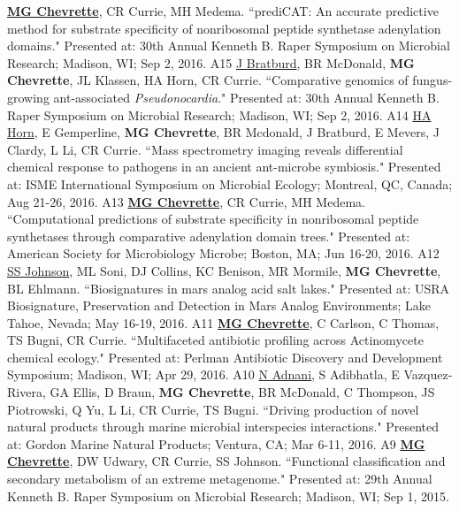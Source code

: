 \begin{cvpubs}
  \cvpub
    {\textbf{\underline{MG Chevrette}}, CR Currie, MH Medema.  ``prediCAT: An accurate predictive method for substrate specificity of nonribosomal peptide synthetase adenylation domains." Presented at: 30th Annual Kenneth B. Raper Symposium on Microbial Research; Madison, WI; Sep 2, 2016.} %
    {A15} %
  \cvpub
    {\underline{J Bratburd}, BR McDonald, \textbf{MG Chevrette}, JL Klassen, HA Horn, CR Currie. ``Comparative genomics of fungus-growing ant-associated \textit{Pseudonocardia}." Presented at: 30th Annual Kenneth B. Raper Symposium on Microbial Research; Madison, WI; Sep 2, 2016.} %
    {A14} %
  \cvpub
    {\underline{HA Horn}, E Gemperline, \textbf{MG Chevrette}, BR Mcdonald, J Bratburd, E Mevers, J Clardy, L Li, CR Currie. ``Mass spectrometry imaging reveals differential chemical response to pathogens in an ancient ant-microbe symbiosis." Presented at: ISME International Symposium on Microbial Ecology; Montreal, QC, Canada; Aug 21-26, 2016.} %
    {A13} %
  \cvpub
    {\textbf{\underline{MG Chevrette}}, CR Currie, MH Medema.  ``Computational predictions of substrate specificity in nonribosomal peptide synthetases through comparative adenylation domain trees." Presented at: American Society for Microbiology Microbe; Boston, MA; Jun 16-20, 2016.} %
    {A12} %
  \cvpub
    {\underline{SS Johnson}, ML Soni, DJ Collins, KC Benison, MR Mormile, \textbf{MG Chevrette}, BL Ehlmann. ``Biosignatures in mars analog acid salt lakes." Presented at: USRA Biosignature, Preservation and Detection in Mars Analog Environments; Lake Tahoe, Nevada; May 16-19, 2016.} %
    {A11} %
  \cvpub
    {\textbf{\underline{MG Chevrette}}, C Carlson, C Thomas, TS Bugni, CR Currie. ``Multifaceted antibiotic profiling across Actinomycete chemical ecology." Presented at: Perlman Antibiotic Discovery and Development Symposium; Madison, WI; Apr 29, 2016.} %
    {A10} %
  \cvpub
    {\underline{N Adnani}, S Adibhatla, E Vazquez-Rivera, GA Ellis, D Braun, \textbf{MG Chevrette}, BR McDonald, C Thompson, JS Piotrowski, Q Yu, L Li, CR Currie, TS Bugni. ``Driving production of novel natural products through marine microbial interspecies interactions." Presented at: Gordon Marine Natural Products; Ventura, CA; Mar 6-11, 2016.} %
    {A9} %
  \cvpub
    {\textbf{\underline{MG Chevrette}}, DW Udwary, CR Currie, SS Johnson. ``Functional classification and secondary metabolism of an extreme metagenome." Presented at: 29th Annual Kenneth B. Raper Symposium on Microbial Research; Madison, WI; Sep 1, 2015.} %

\end{cvpubs}

